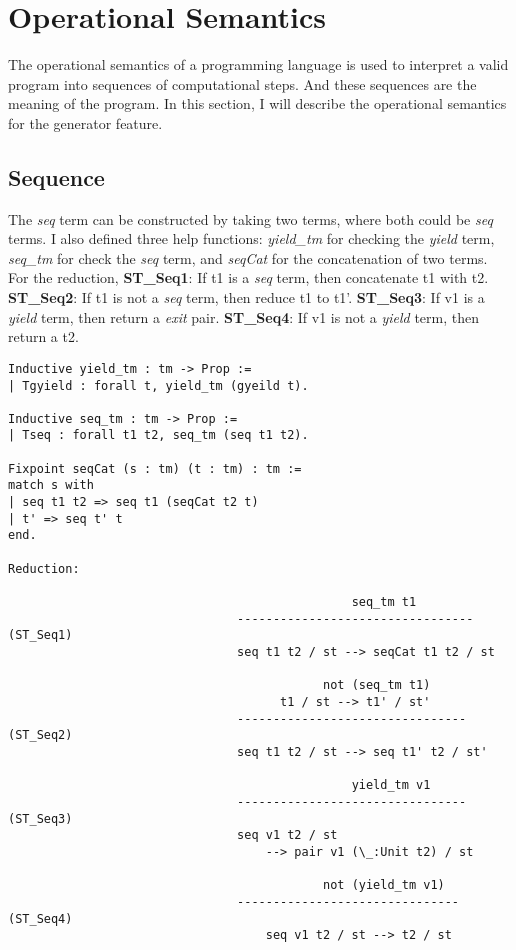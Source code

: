 \section{Operational Semantics}
\label{sec:os}
The operational semantics of a programming language is used to interpret a valid program into sequences of computational steps. And these sequences are the meaning of the program. In this section, I will describe the operational semantics for the generator feature.

\subsection{Sequence}
The \textit{seq} term can be constructed by taking two terms, where both could be \textit{seq} terms.
I also defined three help functions: \textit{yield_tm} for checking the \textit{yield} term, \textit{seq_tm} for check the \textit{seq} term, and \textit{seqCat} for the concatenation of two terms.
For the reduction, \textbf{ST_Seq1}: If t1 is a \textit{seq} term, then concatenate t1 with t2. 
\textbf{ST_Seq2}: If t1 is not a \textit{seq} term, then reduce t1 to t1'. 
\textbf{ST_Seq3}: If v1 is a \textit{yield} term, then return a \textit{exit} pair. 
\textbf{ST_Seq4}: If v1 is not a \textit{yield} term, then return a t2.
\begin{lstlisting}
Inductive yield_tm : tm -> Prop :=
| Tgyield : forall t, yield_tm (gyeild t).

Inductive seq_tm : tm -> Prop :=
| Tseq : forall t1 t2, seq_tm (seq t1 t2).

Fixpoint seqCat (s : tm) (t : tm) : tm :=
match s with
| seq t1 t2 => seq t1 (seqCat t2 t)
| t' => seq t' t
end.

Reduction:

									    		seq_tm t1
								---------------------------------  (ST_Seq1)
								seq t1 t2 / st --> seqCat t1 t2 / st
								
											not (seq_tm t1)
									  t1 / st --> t1' / st'
								--------------------------------   (ST_Seq2)
								seq t1 t2 / st --> seq t1' t2 / st'
								
												yield_tm v1
								--------------------------------   (ST_Seq3)
								seq v1 t2 / st 
									--> pair v1 (\_:Unit t2) / st
								
											not (yield_tm v1)
								-------------------------------  (ST_Seq4)
									seq v1 t2 / st --> t2 / st

\end{lstlisting}

